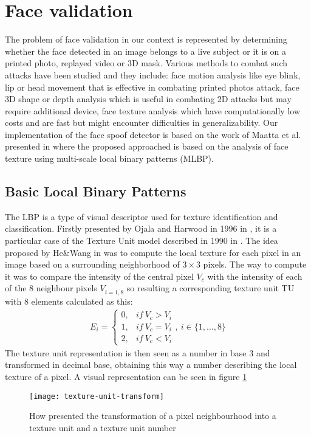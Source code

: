 \section{Face validation}
The problem of face validation in our context is represented by determining whether the face detected in an image belongs to a live subject or it is on a printed photo, replayed video or 3D mask. Various methods to combat such attacks have been studied and they include: face motion analysis \cite{BharadwajDVS13, PanSWL07, TirunagariPWISH15} like eye blink, lip or head movement that is effective in combating printed photos attack, face 3D shape or depth analysis \cite{MarsicoNRD12, LagorioTCFS13} which is useful in combating 2D attacks but may require additional device, face texture analysis \cite{MaattaHP11} which have computationally low costs and are fast but might encounter difficulties in generalizability. Our implementation of the face spoof detector is based on the work of Maatta et al. presented in \cite{MaattaHP11} where the proposed approached is based on the analysis of face texture using multi-scale local binary patterns (MLBP).
\subsection{Basic Local Binary Patterns}
The LBP is a type of visual descriptor used for texture identification and classification. Firstly presented by Ojala and Harwood in 1996 in \cite{ojala1996comparative}, it is a particular case of the Texture Unit model described in 1990 in \cite{HeWang90}. The idea proposed by He\&Wang in \cite{HeWang90} was to compute the local texture for each pixel in an image based on a surrounding neighborhood of $3\times3$ pixels. The way to compute it was to compare the intensity of the central pixel $V_c$ with the intensity of each of the 8 neighbour pixels $V_{i=\overline{1,8}}$ so resulting a corresponding texture unit TU with 8 elements calculated as this:
\begin{align}
	E_i = \begin{cases}
	0, & if\ V_c > V_i \\
	1, & if\ V_c = V_i \\
	2, & if\ V_c < V_i
	\end{cases}, \ i \in \{1,...,8\}
\end{align}
The texture unit representation is then seen as a number in base 3 and transformed in decimal base, obtaining this way a number describing the local texture of a pixel.
A visual representation can be seen in figure \ref{visual-texture-unit}
\begin{figure}[h]
	\begin{center}
		\texttt{[image: texture-unit-transform]}
	\end{center}
	\caption[Visual representation of texture unit transform]{How \cite{HeWang90} presented the transformation of a pixel neighbourhood into a texture unit and a texture unit number}
	\label{visual-texture-unit}
\end{figure}

